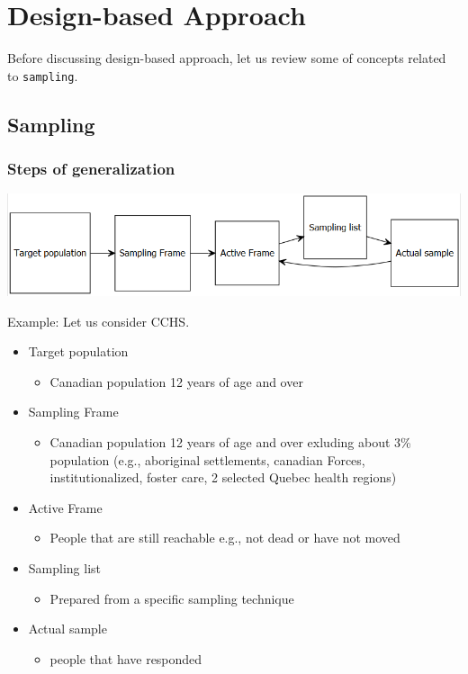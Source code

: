\documentclass[
]{book}
\providecommand{\tightlist}{%
  \setlength{\itemsep}{0pt}\setlength{\parskip}{0pt}}
\begin{document}
\hypertarget{design-based-approach}{%
\chapter{Design-based Approach}\label{design-based-approach}}

Before discussing design-based approach, let us review some of concepts related to \texttt{sampling}.

\hypertarget{sampling}{%
\section{Sampling}\label{sampling}}

\hypertarget{steps-of-generalization}{%
\subsection{Steps of generalization}\label{steps-of-generalization}}

\includegraphics[width=0.65\linewidth]{images/sampling0}

Example: Let us consider CCHS.

\begin{itemize}
\tightlist
\item
  Target population

  \begin{itemize}
  \tightlist
  \item
    Canadian population 12 years of age and over
  \end{itemize}
\item
  Sampling Frame

  \begin{itemize}
  \tightlist
  \item
    Canadian population 12 years of age and over exluding about 3\% population (e.g., aboriginal settlements, canadian Forces, institutionalized, foster care, 2 selected Quebec health regions)
  \end{itemize}
\item
  Active Frame

  \begin{itemize}
  \tightlist
  \item
    People that are still reachable e.g., not dead or have not moved
  \end{itemize}
\item
  Sampling list

  \begin{itemize}
  \tightlist
  \item
    Prepared from a specific sampling technique
  \end{itemize}
\item
  Actual sample

  \begin{itemize}
  \tightlist
  \item
    people that have responded
  \end{itemize}
\end{itemize}
\end{document}
